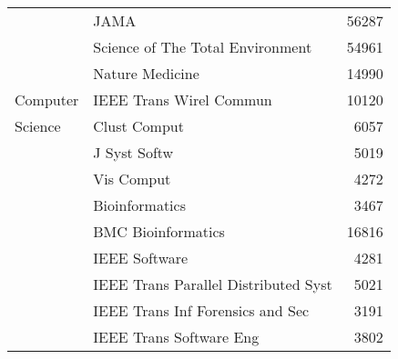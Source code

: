 {\begin{tabular}{p{2.5cm}lr}
        & JAMA & 56287 \\
        & Science of The Total Environment & 54961 \\
        & Nature Medicine & 14990 \\
        \hline
        Computer & IEEE Trans Wirel Commun & 10120 \\
        Science & Clust Comput & 6057 \\
        & J Syst Softw & 5019 \\
        & Vis Comput & 4272 \\
        & Bioinformatics & 3467 \\
        & BMC Bioinformatics & 16816 \\
        & IEEE Software & 4281 \\
        & IEEE Trans Parallel Distributed Syst & 5021 \\
        & IEEE Trans Inf Forensics and Sec & 3191 \\
        & IEEE Trans Software Eng & 3802 \\
         \bottomrule
    \end{tabular}
}